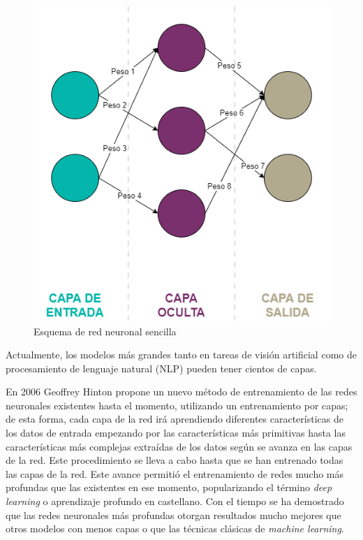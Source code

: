 \begin{figure}
  \centering
  \includegraphics[width=.6\linewidth]{img/simplenet}
  \caption{Esquema de red neuronal sencilla}
  \label{fig:simplenet}
\end{figure}


Actualmente, los modelos más grandes tanto en tareas de visión artificial como de procesamiento de lenguaje natural (NLP) pueden tener cientos de capas.

En 2006 Geoffrey Hinton \cite{geoffreyhinton} propone un nuevo método de entrenamiento de las redes neuronales existentes hasta el momento, utilizando un entrenamiento por capas; de esta forma, cada capa de la red irá aprendiendo diferentes características de los datos de entrada empezando por las características más primitivas hasta las características más complejas extraídas de los datos según se avanza en las capas de la red. Este procedimiento se lleva a cabo hasta que se han entrenado todas las capas de la red. Este avance permitió el entrenamiento de redes mucho más profundas que las existentes en ese momento, popularizando el término \textit{deep learning} o aprendizaje profundo en castellano. Con el tiempo se ha demostrado que las redes neuronales más profundas otorgan resultados mucho mejores que otros modelos con menos capas o que las técnicas clásicas de \textit{machine learning}.


